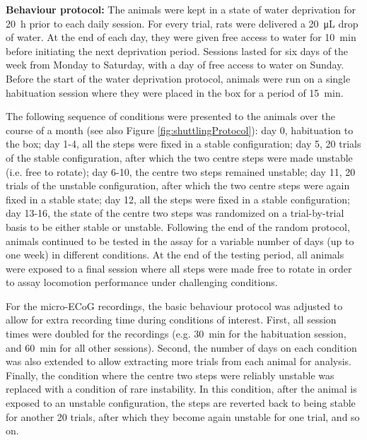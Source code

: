 \textbf{Behaviour protocol:} The animals were kept in a state of water deprivation for \SI{20}{\hour} prior to each daily session. For every trial, rats were delivered a \SI{20}{\micro\liter} drop of water. At the end of each day, they were given free access to water for \SI{10}{\minute} before initiating the next deprivation period. Sessions lasted for six days of the week from Monday to Saturday, with a day of free access to water on Sunday. Before the start of the water deprivation protocol, animals were run on a single habituation session where they were placed in the box for a period of \SI{15}{\minute}.

The following sequence of conditions were presented to the animals over the course of a month (see also Figure \ref{fig:shuttlingProtocol}): day 0, habituation to the box; day 1-4, all the steps were fixed in a stable configuration; day 5, 20 trials of the stable configuration, after which the two centre steps were made unstable (i.e. free to rotate); day 6-10, the centre two steps remained unstable; day 11, 20 trials of the unstable configuration, after which the two centre steps were again fixed in a stable state; day 12, all the steps were fixed in a stable configuration; day 13-16, the state of the centre two steps was randomized on a trial-by-trial basis to be either stable or unstable. Following the end of the random protocol, animals continued to be tested in the assay for a variable number of days (up to one week) in different conditions. At the end of the testing period, all animals were exposed to a final session where all steps were made free to rotate in order to assay locomotion performance under challenging conditions.

For the micro-ECoG recordings, the basic behaviour protocol was adjusted to allow for extra recording time during conditions of interest. First, all session times were doubled for the recordings (e.g. \SI{30}{\minute} for the habituation session, and \SI{60}{\minute} for all other sessions). Second, the number of days on each condition was also extended to allow extracting more trials from each animal for analysis. Finally, the condition where the centre two steps were reliably unstable was replaced with a condition of rare instability. In this condition, after the animal is exposed to an unstable configuration, the steps are reverted back to being stable for another 20 trials, after which they become again unstable for one trial, and so on.

